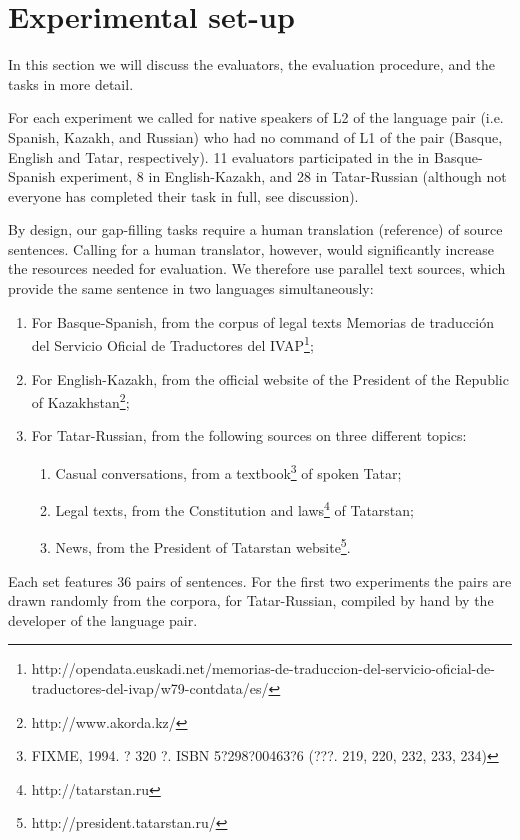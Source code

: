 \documentclass[11pt]{article}
\newcommand{\comment}[1]{\marginpar{\scriptsize\sf \textcolor{blue}{#1}}}
\begin{document}
\section{Experimental set-up}
\label{sec:setup}

In this section we will discuss the evaluators, the evaluation procedure, and the tasks in more detail.

For each experiment we called for native speakers of L2 of the language pair (i.e.
Spanish, Kazakh, and Russian) who had no command of L1 of the pair (Basque, English
and Tatar, respectively). 11 evaluators participated in the in Basque-Spanish experiment, 8 in
English-Kazakh, and 28 in Tatar-Russian (although not everyone has completed their task
in full, see discussion).

\comment{EA: maybe I should put this into the previous section?}
By design, our gap-filling tasks require a human translation (reference) of source sentences. Calling for a human translator, however, would significantly increase the resources needed for evaluation. We therefore use parallel text sources, which provide the same sentence in two languages simultaneously:
\begin{enumerate}
\item  For Basque-Spanish, from the corpus of legal texts Memorias de traducci\'on del
Servicio Oficial de Traductores del IVAP\footnote{http://opendata.euskadi.net/memorias-de-traduccion-del-servicio-oficial-de-traductores-del-ivap/w79-contdata/es/};
\item  For English-Kazakh, from the official website of the President of the Republic of
Kazakhstan\footnote{http://www.akorda.kz/};
\item  For Tatar-Russian, from the following sources on three different topics:
  \begin{enumerate}
\comment{EA: whoops, what is the best way to make it understand cyrillic?}
    \item  Casual conversations, from a textbook\footnote{FIXME, 1994. ? 320 ?. ISBN 5?298?00463?6 (???. 219, 220, 232, 233, 234)} of spoken Tatar;
    \item  Legal texts, from the Constitution and laws\footnote{http://tatarstan.ru} of Tatarstan;
    \item  News, from the President of Tatarstan website\footnote{http://president.tatarstan.ru/}.
  \end{enumerate}
\end{enumerate}

Each set features 36 pairs of sentences. For the first two experiments the pairs are drawn
randomly from the corpora, for Tatar-Russian, compiled by hand by the developer of the
language pair.
\end{document}
